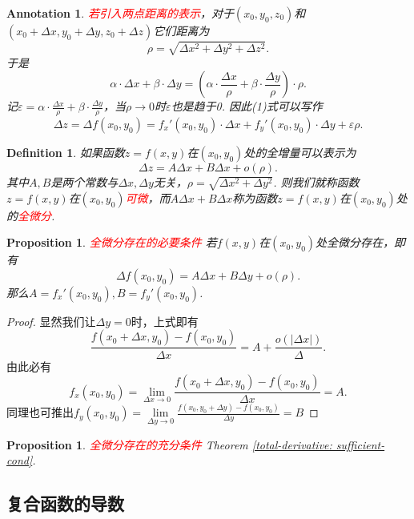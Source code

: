 \documentclass{article}
\newtheorem{proposition}[theorem]{Proposition}
\newtheorem{definition}[theorem]{Definition}
\newtheorem{annotation}[theorem]{Annotation}
\newcommand{\redt}[1]{\textcolor{red}{#1}}
\begin{document}
\begin{annotation}
\rm \redt{若引入两点距离的表示}，对于$(x_0,y_0,z_0)$和$(x_0+\Delta x,y_0 +\Delta y, z_0 + \Delta z)$它们距离为
$$
\rho = \sqrt{\Delta x^2 + \Delta y^2 +\Delta z^2}.
$$
于是
$$
\alpha\cdot\Delta x + \beta \cdot \Delta y = (\alpha\cdot\frac{\Delta x}{\rho} + \beta\cdot\frac{\Delta y}{\rho})\cdot \rho.
$$
记$\varepsilon = \alpha\cdot\frac{\Delta x}{\rho} + \beta\cdot\frac{\Delta y}{\rho}$，当$\rho \to 0$时$\varepsilon$也是趋于0. 因此(1)式可以写作
\begin{equation}
\Delta z = \Delta f(x_0,y_0) = f_x'(x_0,y_0)\cdot \Delta x + f_y'(x_0,y_0) \cdot \Delta y + \varepsilon \rho.
\end{equation}
\end{annotation}

\begin{definition}
\rm 如果函数$z=f(x,y)$在$(x_0,y_0)$处的全增量可以表示为
$$
\Delta z = A\Delta x + B\Delta x + o(\rho).
$$
其中$A,B$是两个常数与$\Delta x,\Delta y$无关，$\rho=\sqrt{\Delta x^2 + \Delta y^2}$. 则我们就称函数$z=f(x,y)$在$(x_0,y_0)$\redt{可微}，而$A\Delta x + B\Delta x$称为函数$z=f(x,y)$在$(x_0,y_0)$处的\redt{全微分}.
\end{definition}

\begin{proposition}
\rm \redt{全微分存在的必要条件} 若$f(x,y)$在$(x_0,y_0)$处全微分存在，即有
$$
\Delta f(x_0,y_0) = A\Delta x + B \Delta y + o(\rho).
$$
那么$A = f_x'(x_0,y_0),B = f_y'(x_0,y_0)$.
\end{proposition}

\begin{proof}
显然我们让$\Delta y = 0$时，上式即有
$$
\frac{f(x_0+\Delta x,y_0)-f(x_0,y_0)}{\Delta x} = A + \frac{o(|\Delta x|)}{\Delta}.
$$
由此必有
$$
f_x(x_0,y_0) = \lim\limits_{\Delta x \to 0} \frac{f(x_0+\Delta x,y_0)-f(x_0,y_0)}{\Delta x} = A.
$$
同理也可推出$f_y(x_0,y_0) = \lim\limits_{\Delta y \to 0} \frac{f(x_0,y_0+\Delta y)-f(x_0,y_0)}{\Delta y} = B $
\end{proof}

\begin{proposition}
\rm \redt{全微分存在的充分条件} Theorem \ref{total-derivative: sufficient-cond}.
\end{proposition}

\subsection{复合函数的导数}
\end{document}
